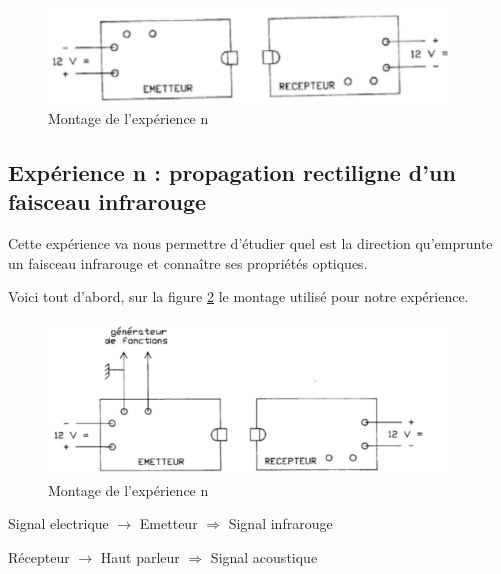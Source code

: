 \documentclass[a4paper]{article}
\begin{document}
\begin{figure}[H]
    \centering
    \includegraphics[width=0.95\textwidth]{images/montage01.PNG}
    \caption{Montage de l'expérience n}
    \label{fig:montage01}
\end{figure}










\subsection{Expérience n : propagation rectiligne d’un faisceau infrarouge}





Cette expérience va nous permettre d'étudier quel est la direction qu'emprunte un faisceau infrarouge et connaître ses propriétés optiques.

Voici tout d'abord, sur la figure \ref{fig:montageExp2} le montage utilisé pour notre expérience.

\begin{figure}[H]
    \centering
    \includegraphics[width=0.95\textwidth]{images/Capture.PNG}
    \caption{Montage de l'expérience n}
    \label{fig:montageExp2}
\end{figure}

\begin{center}
    Signal electrique $\rightarrow$ Emetteur $\Rightarrow$ Signal infrarouge

    Récepteur $\rightarrow$ Haut parleur $\Rightarrow$ Signal acoustique\\[0.4cm]
\end{center}
\end{document}
